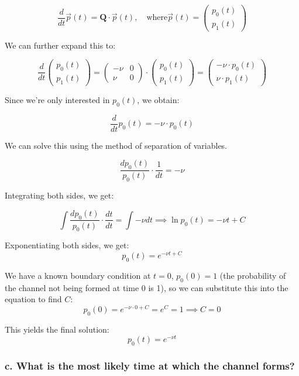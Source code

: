 \documentclass{article}
\begin{document}
\[
    \frac{d}{dt} \vec{p}(t) = \mathbf{Q} \cdot \vec{p}(t), \quad \text{where} \vec{p}(t) = \begin{pmatrix} p_{0}(t) \\ p_{1}(t) \end{pmatrix}
\]

We can further expand this to:

\[
    \frac{d}{dt} \begin{pmatrix} p_0(t) \\ p_1(t) \end{pmatrix} = \begin{pmatrix}
        -\nu & 0 \\
        \nu  & 0
    \end{pmatrix} \cdot \begin{pmatrix} p_{0}(t) \\ p_{1}(t) \end{pmatrix} = \begin{pmatrix} -\nu \cdot p_0(t) \\ \nu \cdot p_1(t) \end{pmatrix}
\]

Since we're only interested in $p_0(t)$, we obtain:

\[
    \frac{d}{dt} p_0(t) = -\nu \cdot p_0(t)
\]

We can solve this using the method of separation of variables.

\[
    \frac{dp_0(t)}{p_0(t)} \cdot \frac{1}{dt} = -\nu
\]

Integrating both sides, we get:

\[
    \int \frac{dp_0(t)}{p_0(t)} \cdot \frac{dt}{dt} = \int -\nu dt \implies \ln p_0(t) = -\nu t + C
\]

Exponentiating both sides, we get:
\[
    p_0(t) = e^{-\nu t + C}
\]

We have a known boundary condition at $t = 0$, $p_0(0) = 1$ (the probability of
the channel not being formed at time 0 is 1), so we can substitute this into
the equation to find $C$:
\[
    p_0(0) = e^{-\nu \cdot 0 + C} = e^C = 1 \implies C = 0
\]

This yields the final solution:
\begin{equation}
    \boxed{p_0(t) = e^{-\nu t}}
\end{equation}

\subsubsection*{c. What is the most likely time at which the channel forms?}
\end{document}
